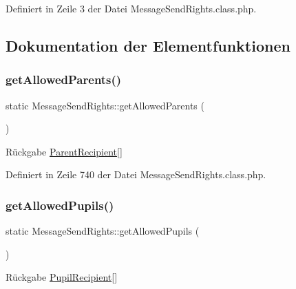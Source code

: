 Definiert in Zeile 3 der Datei Message\+Send\+Rights.\+class.\+php.



\subsection{Dokumentation der Elementfunktionen}
\mbox{\label{class_message_send_rights_adbdb45e1e8c669862de329214902fa2d}} 
\subsubsection{\texorpdfstring{get\+Allowed\+Parents()}{getAllowedParents()}}
{\footnotesize\ttfamily static Message\+Send\+Rights\+::get\+Allowed\+Parents (\begin{DoxyParamCaption}{ }\end{DoxyParamCaption})\hspace{0.3cm}{\ttfamily [static]}}

\begin{DoxyReturn}{Rückgabe}
\mbox{\hyperlink{class_parent_recipient}{Parent\+Recipient}}\mbox{[}\mbox{]} 
\end{DoxyReturn}


Definiert in Zeile 740 der Datei Message\+Send\+Rights.\+class.\+php.

\mbox{\label{class_message_send_rights_a5ea885d113c520d24864d8b869db278d}} 
\subsubsection{\texorpdfstring{get\+Allowed\+Pupils()}{getAllowedPupils()}}
{\footnotesize\ttfamily static Message\+Send\+Rights\+::get\+Allowed\+Pupils (\begin{DoxyParamCaption}{ }\end{DoxyParamCaption})\hspace{0.3cm}{\ttfamily [static]}}

\begin{DoxyReturn}{Rückgabe}
\mbox{\hyperlink{class_pupil_recipient}{Pupil\+Recipient}}\mbox{[}\mbox{]} 
\end{DoxyReturn}


